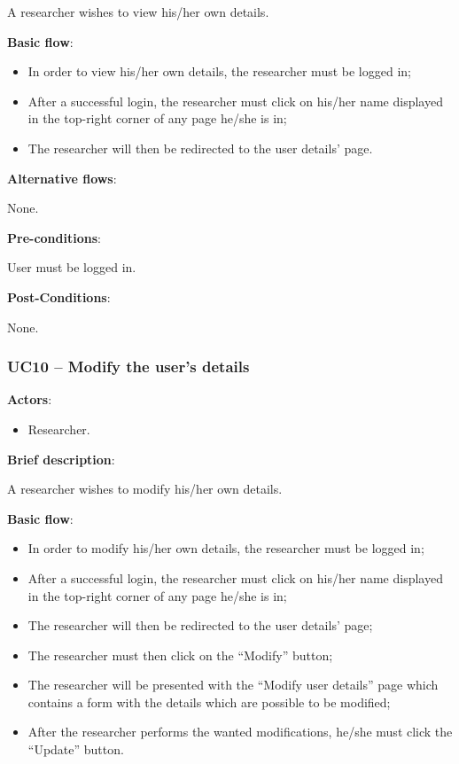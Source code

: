 A researcher wishes to view his/her own details. 

\textbf{Basic flow}:

\begin{itemize}
\item In order to view his/her own details, the researcher must be logged in;
\item After a successful login, the researcher must click on his/her name displayed in the top-right corner of any page he/she is in;
\item The researcher will then be redirected to the user details' page.
\end{itemize}

\textbf{Alternative flows}:

None.

\textbf{Pre-conditions}:

User must be logged in.

\textbf{Post-Conditions}:

None.

\subsubsection{UC10 -- Modify the user's details}\label{uc10}

\textbf{Actors}:

\begin{itemize}
\item Researcher.
\end{itemize}

\textbf{Brief description}:

A researcher wishes to modify his/her own details. 

\textbf{Basic flow}:

\begin{itemize}
\item In order to modify his/her own details, the researcher must be logged in;
\item After a successful login, the researcher must click on his/her name displayed in the top-right corner of any page he/she is in;
\item The researcher will then be redirected to the user details' page;
\item The researcher must then click on the ``Modify'' button;
\item The researcher will be presented with the ``Modify user details'' page which contains a form with the details which are possible to be modified;
\item After the researcher performs the wanted modifications, he/she must click the ``Update'' button.
\end{itemize}

